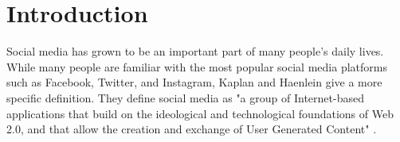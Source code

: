 \chapter{Introduction}
\label{cha:Chapter1_Introduction}

\iffalse

Total length: up to 5 Months = ~20 weeks oder
\selectlanguage{german}{

Abstract fertig machen, konkreter werden --> vor allem Methoden, kleiner Ansatz


Length: 1-2 pages
Inhaltsverzeichnis --> auch mehr Punkte

Methodology and Implementation --> kann man auch anders aufteilen
Motivation, Hintergrund

Warum diese Plattform --> einfache API

Auch aufpassen illegal

Wann schreiben? --> am Anfang, am Ende? Erstmal Entwurf am Ende
}
\selectlanguage{english}
%
%

\fi

Social media has grown to be an important part of many people's daily lives. While many people are familiar with the most popular social media platforms such as Facebook, Twitter, and Instagram, Kaplan and Haenlein give a more specific definition. They define social media as "a group of Internet-based applications that build on the ideological and technological foundations of Web 2.0, and that allow the creation and exchange of User Generated Content" \cite[p.~61]{KAPLAN201059}. 


